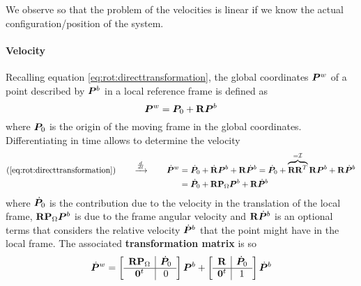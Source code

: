 		We observe so that the problem of the velocities is linear if we know the actual configuration/position of the system.
		
		
		\paragraph{Velocity} Recalling equation \ref{eq:rot:directtransformation}, the global coordinates $\boldsymbol{P}^w$ of a point described by $\boldsymbol{P}^b$ in a local reference frame is defined as
		\[ \boldsymbol{P}^w = \boldsymbol{P}_0 + \mathbf{R} \boldsymbol{P}^b \]
		where $\boldsymbol{P}_0$ is the origin of the moving frame in the global coordinates. Differentiating in time allows to determine the velocity
		\begin{equation} \label{eq:rot:velocity}
		\begin{split}
			(\ref{eq:rot:directtransformation}) \qquad \xrightarrow{\frac d{dt}} \qquad \dot{\boldsymbol{P}}^w & = \dot{\boldsymbol{P}}_0 + \dot {\mathbf{R}} \boldsymbol{P}^b + \mathbf{R} \dot{\boldsymbol{P}}^b = \dot{\boldsymbol{P}}_0 + \overbrace{\mathbf{R} \mathbf{R}^T}^{=\mathcal I} \mathbf{R} \boldsymbol{P}^b + \mathbf{R} \dot{\boldsymbol{P}}^b \\
			& = \dot{\boldsymbol{P}}_0 + \mathbf{R} \mathbf{P}_\Omega \boldsymbol{P}^b + \mathbf{R} \dot{\boldsymbol{P}}^b
		\end{split}
		\end{equation}
		where $\dot{\boldsymbol{P}}_0$ is the contribution due to the velocity in the translation of the local frame, $\mathbf{R} \mathbf{P}_\Omega \boldsymbol{P}^b$ is due to the frame angular velocity and $\mathbf{R} \dot{\boldsymbol{P}}^b$ is an optional terms that considers the relative velocity $\dot{\boldsymbol{P}}^b$ that the point might have in the local frame. The associated \textbf{transformation matrix} is so
		\[ \dot{\boldsymbol{P}}^w = \begin{bmatrix}  \begin{array}{c|c}
			\mathbf{R}\mathbf{P}_\Omega & \dot{\boldsymbol{P}}_0 \\ \hline \boldsymbol{0}^t & 0 
		\end{array} \end{bmatrix} \boldsymbol{P}^b + \begin{bmatrix}  \begin{array}{c|c}
			\mathbf{R} & \dot{\boldsymbol{P}}_0 \\ \hline \boldsymbol{0}^t & 1 
		\end{array} \end{bmatrix} \dot{\boldsymbol{P}}^b\]
	
